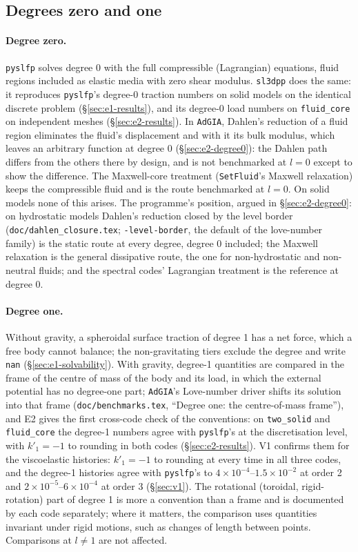 \documentclass[11pt]{article}
\numberwithin{equation}{section}
\newcommand{\code}[1]{\texttt{#1}}
\begin{document}
\subsection{Degrees zero and one}
\label{sec:degrees01}

\paragraph{Degree zero.} \code{pyslfp} solves degree 0 with the full
compressible (Lagrangian) equations, fluid regions included as elastic
media with zero shear modulus. \code{sl3dpp} does the same: it reproduces \code{pyslfp}'s degree-0
traction numbers on solid models on the identical discrete problem
(\S\ref{sec:e1-results}), and its degree-0 load numbers on
\code{fluid\_core} on independent meshes (\S\ref{sec:e2-results}). In
\code{AdGIA}, Dahlen's reduction of a fluid region eliminates the fluid's
displacement and with it its bulk modulus, which leaves an arbitrary
function at degree 0 (\S\ref{sec:e2-degree0}): the Dahlen path differs
from the others there by design, and is not benchmarked at $l=0$ except to
show the difference. The Maxwell-core treatment (\code{SetFluid}'s Maxwell
relaxation) keeps the compressible fluid and is the route benchmarked at
$l=0$. On solid models none of this arises. The programme's position,
argued in \S\ref{sec:e2-degree0}: on hydrostatic models Dahlen's
reduction closed by the level border (\code{doc/dahlen\_closure.tex};
\code{-level-border}, the default of the love-number family) is the
static route at every degree, degree 0 included; the Maxwell relaxation
is the general dissipative route, the one for non-hydrostatic and
non-neutral fluids; and the spectral codes' Lagrangian treatment is the
reference at degree 0.

\paragraph{Degree one.} Without gravity, a spheroidal surface traction of
degree 1 has a net force, which a free body cannot balance; the
non-gravitating tiers exclude the degree and write \code{nan}
(\S\ref{sec:e1-solvability}). With gravity, degree-1 quantities are
compared in the frame of the centre of mass of the body and its load, in
which the external potential has no degree-one part; \code{AdGIA}'s
Love-number driver shifts its solution into that frame
(\code{doc/benchmarks.tex}, ``Degree one: the centre-of-mass frame''), and
E2 gives the first cross-code check of the conventions: on
\code{two\_solid} and \code{fluid\_core} the degree-1 numbers agree with
\code{pyslfp}'s at the discretisation level, with $k'_1=-1$ to rounding in
both codes (\S\ref{sec:e2-results}). V1 confirms them for the viscoelastic
histories: $k'_1=-1$ to rounding at every time in all three codes, and the
degree-1 histories agree with \code{pyslfp}'s to
$4\times10^{-4}$--$1.5\times10^{-2}$ at order 2 and
$2\times10^{-5}$--$6\times10^{-4}$ at order 3 (\S\ref{sec:v1}). The rotational (toroidal, rigid-rotation) part of degree 1 is
more a convention than a frame and is documented by each code separately;
where it matters, the comparison uses quantities invariant under rigid
motions, such as changes of length between points. Comparisons at
$l\ne1$ are not affected.
\end{document}
